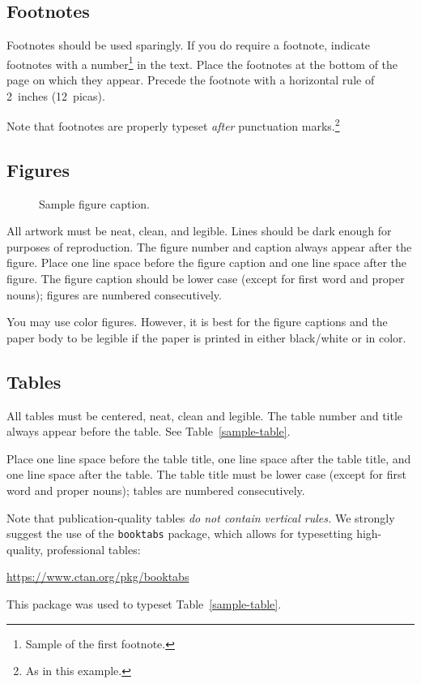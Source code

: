 \documentclass{article}
\begin{document}
\subsection{Footnotes}


Footnotes should be used sparingly.  If you do require a footnote, indicate
footnotes with a number\footnote{Sample of the first footnote.} in the
text. Place the footnotes at the bottom of the page on which they appear.
Precede the footnote with a horizontal rule of 2~inches (12~picas).


Note that footnotes are properly typeset \emph{after} punctuation
marks.\footnote{As in this example.}


\subsection{Figures}


\begin{figure}
  \centering
  \fbox{\rule[-.5cm]{0cm}{4cm} \rule[-.5cm]{4cm}{0cm}}
  \caption{Sample figure caption.}
\end{figure}


All artwork must be neat, clean, and legible. Lines should be dark enough for
purposes of reproduction. The figure number and caption always appear after the
figure. Place one line space before the figure caption and one line space after
the figure. The figure caption should be lower case (except for first word and
proper nouns); figures are numbered consecutively.


You may use color figures.  However, it is best for the figure captions and the
paper body to be legible if the paper is printed in either black/white or in
color.


\subsection{Tables}


All tables must be centered, neat, clean and legible.  The table number and
title always appear before the table.  See Table~\ref{sample-table}.


Place one line space before the table title, one line space after the
table title, and one line space after the table. The table title must
be lower case (except for first word and proper nouns); tables are
numbered consecutively.


Note that publication-quality tables \emph{do not contain vertical rules.} We
strongly suggest the use of the \verb+booktabs+ package, which allows for
typesetting high-quality, professional tables:
\begin{center}
  \url{https://www.ctan.org/pkg/booktabs}
\end{center}
This package was used to typeset Table~\ref{sample-table}.
\end{document}
